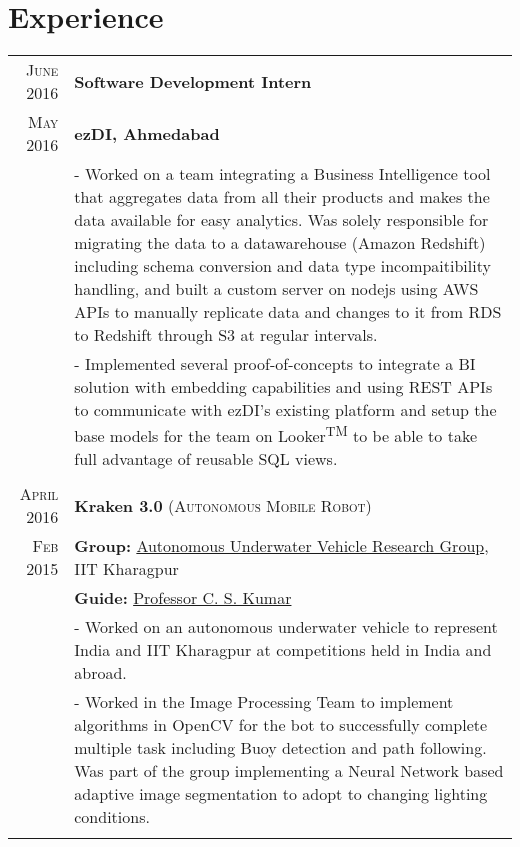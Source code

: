 \documentclass[a4paper,10pt]{extarticle} %
\begin{document}
\section{Experience}

\begin{tabular}{r|p{16cm}}

\textsc{June 2016} & \textbf{Software Development Intern}\\
\textsc{May 2016} & \textbf{ezDI, Ahmedabad}\\
& \footnotesize{- Worked on a team integrating a Business Intelligence tool that aggregates data from all their products and makes the data available for easy analytics. Was solely responsible for migrating the data to a datawarehouse (Amazon Redshift) including schema conversion and data type incompaitibility handling, and built a custom server on nodejs using AWS APIs to manually replicate data and changes to it from RDS to Redshift through S3 at regular intervals.}\\
& \footnotesize{- Implemented several proof-of-concepts to integrate a BI solution with embedding capabilities and using REST APIs to communicate with ezDI's existing platform and setup the base models for the team on Looker{\textsuperscript{TM}} to be able to take full advantage of reusable SQL views.}\\
\multicolumn{2}{c}{} \\

\textsc{April 2016} & \textbf{Kraken 3.0} \textsc{(Autonomous Mobile Robot)} \\
\textsc{Feb 2015} & \textbf{Group: }\textmd{\href{http://auv-iitkgp.in/}{Autonomous Underwater Vehicle Research Group}}, IIT Kharagpur\\
& \textbf{Guide: }\textmd{\href{http://iitkgp.ac.in/fac-profiles/showprofile.php?empcode=aWmdU}{Professor C. S. Kumar}}\\
& \footnotesize{- Worked on an autonomous underwater vehicle to represent India and IIT Kharagpur at competitions held in India and abroad.}\\
& \footnotesize{- Worked in the Image Processing Team to implement algorithms in OpenCV for the bot to successfully complete multiple task including Buoy detection and path following. Was part of the group implementing a Neural Network based adaptive image segmentation to adopt to changing lighting conditions.}\\
\multicolumn{2}{c}{} \\

\end{tabular}
\end{document}
